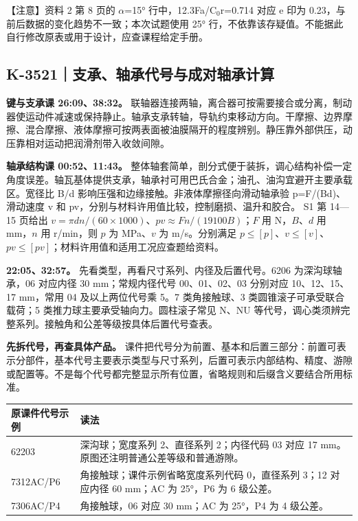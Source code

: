 \documentclass[zihao=5,a4paper,UTF8,fontset=fandol]{ctexart}
\begin{document}
【注意】资料 2 第 8 页的 $\alpha$=15° 行中，12.3Fa/C$_{0}$r=0.714 对应 e 印为 0.23，与前后数据的变化趋势不一致；本次试题使用 25° 行，不依靠该存疑值。不能据此自行修改原表或用于设计，应查课程给定手册。





\subsection{K-3521｜支承、轴承代号与成对轴承计算}
\label{k-3521}

\textbf{键与支承课 26:09、38:32。} 联轴器连接两轴，离合器可按需要接合或分离，制动器使运动件减速或保持静止。轴承支承转轴，导轨约束移动方向。干摩擦、边界摩擦、混合摩擦、液体摩擦可按两表面被油膜隔开的程度辨别。静压靠外部供压，动压靠相对运动把润滑剂带入收敛间隙。


\textbf{轴承结构课 00:52、11:43。} 整体轴套简单，剖分式便于装拆，调心结构补偿一定角度误差。轴瓦基体提供支承，轴承衬可用巴氏合金；油孔、油沟宜避开主要承载区。宽径比 B/d 影响压强和边缘接触。非液体摩擦径向滑动轴承验 p=F/(Bd)、滑动速度 v 和 pv，分别与材料许用值比较，控制磨损、温升和胶合。 S1 第 14—15 页给出 $v=\pi dn/(60\times1000)$、$pv\approx Fn/(19100B)$；$F$ 用 N，$B$、$d$ 用 mm，$n$ 用 r/min，则 $p$ 为 MPa、$v$ 为 m/s。分别满足 $p\leq[p]$、$v\leq[v]$、$pv\leq[pv]$；材料许用值和适用工况应查题给资料。


\textbf{22:05、32:57。} 先看类型，再看尺寸系列、内径及后置代号。6206 为深沟球轴承，06 对应内径 30 mm；常规内径代号 00、01、02、03 分别对应 10、12、15、17 mm，常用 04 及以上两位代号乘 5。7 类角接触球、3 类圆锥滚子可承受联合载荷；5 类推力球主要承受轴向力。圆柱滚子常见 N、NU 等代号，调心类须辨完整系列。接触角和公差等级按具体后置代号查表。


\textbf{先拆代号，再查具体产品。} 课件把代号分为前置、基本和后置三部分：前置可表示分部件，基本代号主要表示类型与尺寸系列，后置可表示内部结构、精度、游隙或配置等。不是每个代号都完整显示所有位置，省略规则和后缀含义要结合所用标准。


\begin{longtable}{p{7.51cm}p{7.51cm}}
\toprule
原课件代号示例 & 读法 \\

\midrule
\endhead
62203 & 深沟球；宽度系列 2、直径系列 2；内径代码 03 对应 17 mm。原图还注明普通公差等级和普通游隙。 \\
7312AC/P6 & 角接触球；课件示例省略宽度系列代码 0，直径系列 3；12 对应内径 60 mm；AC 为 25°，P6 为 6 级公差。 \\
7306AC/P4 & 角接触球，06 对应 30 mm；AC 为 25°，P4 为 4 级公差。 \\
\bottomrule
\end{longtable}
\end{document}
